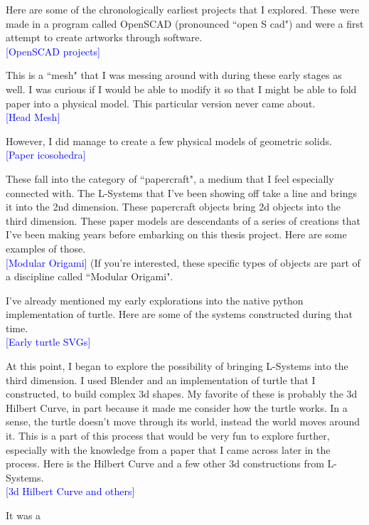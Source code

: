 \documentclass[12pt,twoside]{reedthesis}
\begin{document}
	Here are some of the chronologically earliest projects that I explored. These were made in a program called OpenSCAD (pronounced ``open S cad") and were a first attempt to create artworks through software.\\
	\textcolor{blue}{[OpenSCAD projects]}
	
	This is a ``mesh" that I was messing around with during these early stages as well. I was curious if I would be able to modify it so that I might be able to fold paper into a physical model. This particular version never came about.\\
	\textcolor{blue}{[Head Mesh]}
	
	However, I did manage to create a few physical models of geometric solids.\\
	\textcolor{blue}{[Paper icosohedra]}
	
	These fall into the category of ``papercraft", a medium that I feel especially connected with. The L-Systems that I've been showing off take a line and brings it into the 2nd dimension. These papercraft objects bring 2d objects into the third dimension. These paper models are descendants of a series of creations that I've been making years before embarking on this thesis project. Here are some examples of those.\\
	\textcolor{blue}{[Modular Origami]} (If you're interested, these specific types of objects are part of a discipline called ``Modular Origami".
	
	I've already mentioned my early explorations into the native python implementation of turtle. Here are some of the systems constructed during that time.\\
	\textcolor{blue}{[Early turtle SVGs]}
	
	At this point, I began to explore the possibility of bringing L-Systems into the third dimension. I used Blender and an implementation of turtle that I constructed, to build complex 3d shapes. My favorite of these is probably the 3d Hilbert Curve, in part because it made me consider how the turtle works. In a sense, the turtle doesn't move through its world, instead the world moves around it. This is a part of this process that would be very fun to explore further, especially with the knowledge from a paper that I came across later in the process. Here is the Hilbert Curve and a few other 3d constructions from L-Systems.\\
	\textcolor{blue}{[3d Hilbert Curve and others]}
	
	It was a
\end{document}
